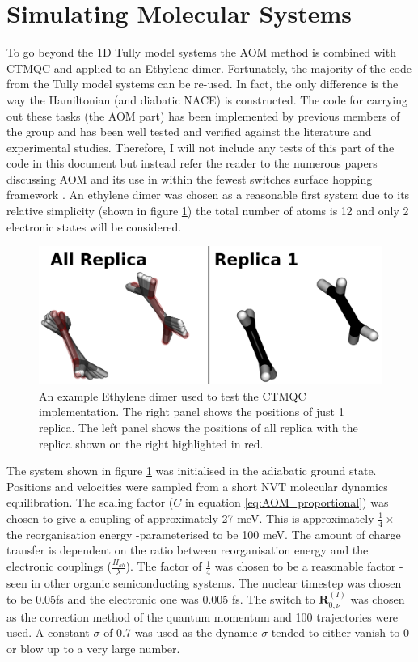\section{Simulating Molecular Systems}
To go beyond the 1D Tully model systems the AOM method is combined with CTMQC and applied to an Ethylene dimer. Fortunately, the majority of the code from the Tully model systems can be re-used. In fact, the only difference is the way the Hamiltonian (and diabatic NACE) is constructed. The code for carrying out these tasks (the AOM part) has been implemented by previous members of the group and has been well tested and verified against the literature and experimental studies. Therefore, I will not include any tests of this part of the code in this document but instead refer the reader to the numerous papers discussing AOM and its use in within the fewest switches surface hopping framework \cite{Carof2017FSSH, C9FD00046A, C9CP04770K, FOB-SH_Spencer, C6FD00107F,FlickPolarons, Giannini2018Crossover, Giannini2019, C9TC05270D,Gajdos2014, AOM_vs_HigherOrder}. An ethylene dimer was chosen as a reasonable first system due to its relative simplicity (shown in figure \ref{fig:EthDimer}) the total number of atoms is 12 and only 2 electronic states will be considered.
\begin{figure}[ht]
  \includegraphics[width=\textwidth]{./img/CTMQC/Ethylene_Annotated.png}
  \caption{\label{fig:EthDimer}An example Ethylene dimer used to test the CTMQC implementation. The right panel shows the positions of just 1 replica. The left panel shows the positions of all replica with the replica shown on the right highlighted in red.}
\end{figure}
The system shown in figure \ref{fig:EthDimer} was initialised in the adiabatic ground state. Positions and velocities were sampled from a short NVT molecular dynamics equilibration. The scaling factor ($C$ in equation \eqref{eq:AOM_proportional}) was chosen to give a coupling of approximately 27 meV. This is approximately $\frac{1}{4} \times$ the reorganisation energy -parameterised to be 100 meV. The amount of charge transfer is dependent on the ratio between reorganisation energy and the electronic couplings ($\frac{H_{ab}}{\lambda}$). The factor of $\frac{1}{4}$ was chosen to be a reasonable factor -seen in other organic semiconducting systems. The nuclear timestep was chosen to be 0.05fs and the electronic one was 0.005 fs. The switch to $\mathbf{R}_{0, \nu}^{(I)}$ was chosen as the correction method of the quantum momentum and 100 trajectories were used. A constant $\sigma$ of 0.7 was used as the dynamic $\sigma$ tended to either vanish to 0 or blow up to a very large number.

